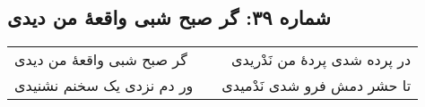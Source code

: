 \begin{center}
\section*{شماره ۳۹: گر صبح شبی واقعۀ من دیدی}
\label{sec:039}
\begin{longtable}{l p{0.5cm} r}
گر صبح شبی واقعهٔ من دیدی
&&
در پرده شدی پردهٔ من نَدْریدی
\\
ور دم نزدی یک سخنم نشنیدی
&&
تا حشر دمش فرو شدی نَدْمیدی
\\
\end{longtable}
\end{center}
